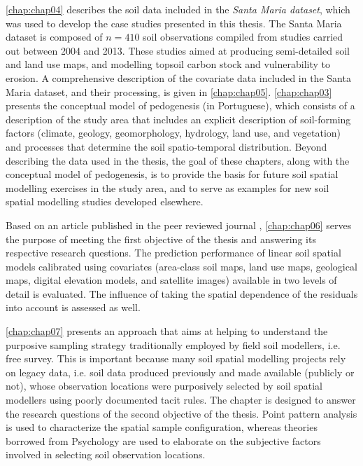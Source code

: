 \autoref{chap:chap04} describes the soil data included in the \emph{Santa Maria dataset}, which was used to 
develop the case studies presented in this thesis. The Santa Maria dataset is composed of $n = 410$ soil 
observations compiled from studies carried out between \num{2004} and \num{2013}. These studies aimed at 
producing semi-detailed soil and land use maps, and modelling topsoil carbon stock and vulnerability to 
erosion. A comprehensive description of the covariate data included in the Santa Maria dataset, and their 
processing, is given in \autoref{chap:chap05}. \autoref{chap:chap03} presents the conceptual model of 
pedogenesis (in Portuguese), which consists of a description of the study area that includes an explicit 
description of soil-forming factors (climate, geology, geomorphology, hydrology, land use, and vegetation) and 
processes that determine the soil spatio-temporal distribution. Beyond describing the data used in the thesis, 
the goal of these chapters, along with the conceptual model of pedogenesis, is to provide the basis for future 
soil spatial modelling exercises in the study area, and to serve as examples for new soil spatial modelling 
studies developed elsewhere.

Based on an article published in the peer reviewed journal \geoderma, \autoref{chap:chap06} serves 
the purpose of meeting the first objective of the thesis and answering its respective research questions. The 
prediction performance of linear soil spatial models calibrated using covariates (area-class soil maps, land 
use maps, geological maps, digital elevation models, and satellite images) available in two levels of detail 
is evaluated. The influence of taking the spatial dependence of the residuals into account is assessed as 
well. 

\autoref{chap:chap07} presents an approach that aims at helping to understand the purposive 
sampling strategy traditionally employed by field soil modellers, i.e. free survey. This is important because 
many soil spatial modelling projects rely on legacy data, i.e. soil data produced previously and made available 
(publicly or not), whose observation locations were purposively selected by soil spatial modellers using 
poorly documented tacit rules. The chapter is designed to answer the research questions of the second objective 
of the thesis. Point pattern analysis is used to characterize the spatial sample configuration, 
whereas theories borrowed from Psychology are used to elaborate on the subjective factors involved in selecting 
soil observation locations.

